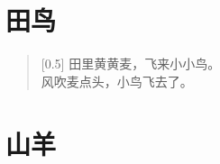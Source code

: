 \documentclass[12pt,UTF-8,openany]{ctexbook}
\begin{document}
\hanzibox{}\hanzibox{}\hanzibox{}\hanzibox{}\hspace{1em}\hanzibox{}\hanzibox{}\hanzibox{}\hanzibox{}

\hanzibox{}\hanzibox{}\hanzibox{}\hanzibox{}\hspace{1em}\hanzibox{}\hanzibox{}\hanzibox{}\hanzibox{}






\chapter{田鸟}

\begin{large}
    
    \begin{verse}[0.5\linewidth]
        田里黄黄麦，飞来小小鸟。 \\
        风吹麦点头，小鸟飞去了。
    \end{verse}
    
\end{large}


\clearpage

\begin{center}
    
    
    
\end{center}


\hanzibox{}\hanzibox{}\hanzibox{}\hanzibox{}\hspace{1em}\hanzibox{}\hanzibox{}\hanzibox{}\hanzibox{}

\hanzibox{}\hanzibox{}\hanzibox{}\hanzibox{}\hspace{1em}\hanzibox{}\hanzibox{}\hanzibox{}\hanzibox{}

\hanzibox{}\hanzibox{}\hanzibox{}\hanzibox{}\hspace{1em}\hanzibox{}\hanzibox{}\hanzibox{}\hanzibox{}

\hanzibox{}\hanzibox{}\hanzibox{}\hanzibox{}\hspace{1em}




\chapter{山羊}
\end{document}
